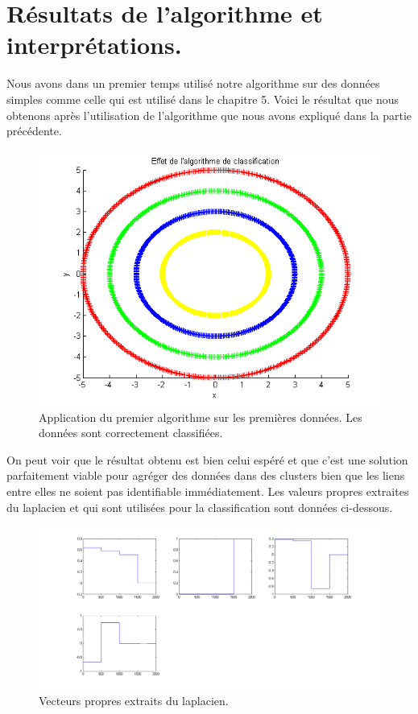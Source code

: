 \chapter{Résultats de l'algorithme et interprétations.}


Nous avons dans un premier temps utilisé notre algorithme sur des données simples comme celle qui est utilisé dans le chapitre 5. Voici le résultat que nous obtenons après l'utilisation de l'algorithme que nous avons expliqué dans la partie précédente.

\begin{figure}[H]
\centering
    \includegraphics[scale=0.6,angle=0]{Images/AlgoClssification.png}
    \caption{Application du premier algorithme sur les premières données. Les données sont correctement classifiées.}
    \label{fig:AlgoClssification}
\end{figure}

On peut voir que le résultat obtenu est bien celui espéré et que c'est une solution parfaitement viable pour agréger des données dans des clusters bien que les liens entre elles ne soient pas identifiable immédiatement. Les valeurs propres extraites du laplacien et qui sont utilisées pour la classification sont données ci-dessous.

\begin{figure}[H]
\centering
    \includegraphics[scale=0.4,angle=0]{Images/VecteursPropres.png}
    \caption{Vecteurs propres extraits du laplacien.}
    \label{fig:VecteursPropres}
\end{figure}

